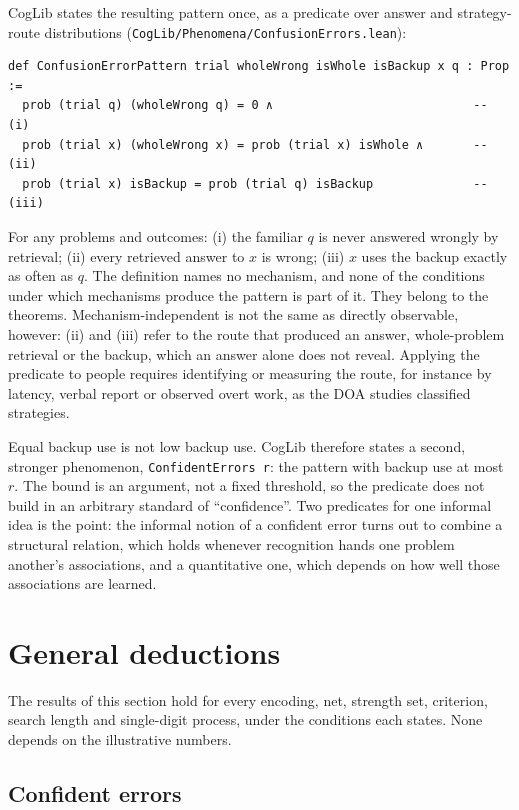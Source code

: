 \documentclass[11pt]{article}
\newcommand{\code}[1]{\texttt{#1}}
\newcommand{\lean}[1]{\texttt{#1}}
\begin{document}
CogLib states the resulting pattern once, as a predicate over answer and strategy-route distributions (\code{CogLib/Phenomena/ConfusionErrors.lean}):
\begin{Verbatim}[fontsize=\small]
def ConfusionErrorPattern trial wholeWrong isWhole isBackup x q : Prop :=
  prob (trial q) (wholeWrong q) = 0 ∧                            -- (i)
  prob (trial x) (wholeWrong x) = prob (trial x) isWhole ∧       -- (ii)
  prob (trial x) isBackup = prob (trial q) isBackup              -- (iii)
\end{Verbatim}
For any problems and outcomes: (i) the familiar $q$ is never answered wrongly by retrieval; (ii) every retrieved answer to $x$ is wrong; (iii) $x$ uses the backup exactly as often as $q$. The definition names no mechanism, and none of the conditions under which mechanisms produce the pattern is part of it. They belong to the theorems. Mechanism-independent is not the same as directly observable, however: (ii) and (iii) refer to the route that produced an answer, whole-problem retrieval or the backup, which an answer alone does not reveal. Applying the predicate to people requires identifying or measuring the route, for instance by latency, verbal report or observed overt work, as the DOA studies classified strategies.

Equal backup use is not low backup use. CogLib therefore states a second, stronger phenomenon, \lean{ConfidentErrors r}: the pattern with backup use at most $r$. The bound is an argument, not a fixed threshold, so the predicate does not build in an arbitrary standard of ``confidence''. Two predicates for one informal idea is the point: the informal notion of a confident error turns out to combine a structural relation, which holds whenever recognition hands one problem another's associations, and a quantitative one, which depends on how well those associations are learned.

\section{General deductions}
\label{sec:results}

The results of this section hold for every encoding, net, strength set, criterion, search length and single-digit process, under the conditions each states. None depends on the illustrative numbers.

\subsection{Confident errors}
\end{document}
